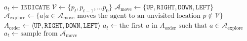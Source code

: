 \begin{algorithmic}
        \State \(a_t \leftarrow \mathtt{INDICATE}\)
    \Else
        \State \(\mathcal{V} \leftarrow \{p_t, p_{t-1}, \dots p_0\}\)
        \State \(\mathcal{A}_{\text{move}} \leftarrow \{\mathtt{UP}, \mathtt{RIGHT}, \mathtt{DOWN}, \mathtt{LEFT}\}\)
        \State \(\mathcal{A}_{\text{explore}} \leftarrow \{a | a \in \mathcal{A}_{\text{move}} \text{ moves the agent to an unvisited location } p \notin \mathcal{V}\}\) 
            \State \(A_{\text{order}} \leftarrow \langle \mathtt{UP}, \mathtt{RIGHT}, \mathtt{DOWN}, \mathtt{LEFT} \rangle\)
            \State \(a_t \leftarrow \text{the first } a \text{ in } A_{\text{order}} \text{ such that } a \in \mathcal{A}_{\text{explore}}\)
        \Else
            \State \(a_t \leftarrow \text{sample from } \mathcal{A}_{\text{move}}\)
        \EndIf
    \EndIf
\end{algorithmic}